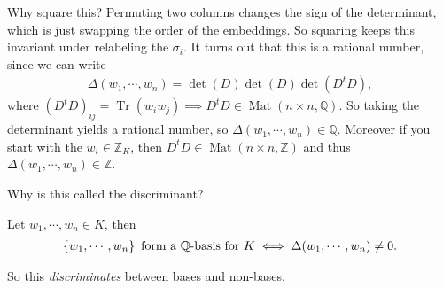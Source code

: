 \begin{remark}

Why square this? Permuting two columns changes the sign of the
determinant, which is just swapping the order of the embeddings. So
squaring keeps this invariant under relabeling the \(\sigma_i\). It
turns out that this is a rational number, since we can write
\begin{align*}
\Delta(w_1, \cdots, w_n) 
= \det(D) \det(D) 
\det(D^t D)
,\end{align*}
where
\((D^t D)_{ij} = \operatorname{Tr}(w_i w_j) \implies D^t D \in \operatorname{Mat}(n\times n, {\mathbb{Q}})\).
So taking the determinant yields a rational number, so
\(\Delta(w_1, \cdots, w_n) \in {\mathbb{Q}}\). Moreover if you start
with the \(w_i \in {\mathbb{Z}}_K\), then
\(D^t D \in \operatorname{Mat}(n\times n, {\mathbb{Z}})\) and thus
\(\Delta(w_1, \cdots, w_n) \in {\mathbb{Z}}\).

Why is this called the discriminant?

\end{remark}

\begin{theorem}

Let \(w_1, \cdots, w_n\in K\), then
\begin{align*}
\left\{{ w_1, \cdots, w_n }\right\} \text{ form a ${\mathbb{Q}}{\hbox{-}}$basis for $K$}
\iff
\Delta(w_1, \cdots, w_n) \neq 0
.\end{align*}

\end{theorem}

\begin{remark}

So this \emph{discriminates} between bases and non-bases.

\end{remark}

